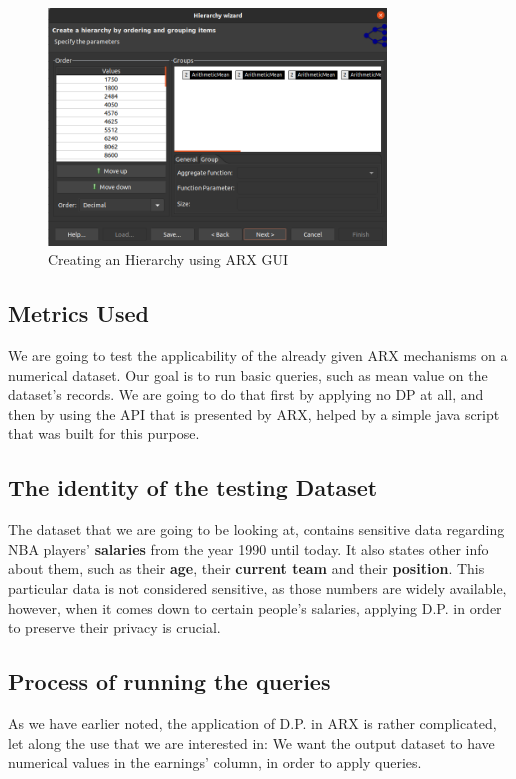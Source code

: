 \begin{figure}[!htb]\centering
    \includegraphics[width=0.8\textwidth]{images/hierarchies.png}
    \caption{Creating an Hierarchy using ARX GUI}
\end{figure}


\subsection{Metrics Used}
We are going to test the applicability of the already given ARX mechanisms on a numerical dataset. Our goal is to run basic queries, such as mean value on the dataset's records. We are going to do that first by applying no DP at all, and then by using the API that is presented by ARX, helped by a simple java script that was built for this purpose.


\subsection{The identity of the testing Dataset}
The dataset that we are going to be looking at, contains sensitive data regarding NBA players' \textbf{salaries} from the year 1990 until today. It also states other info about them, such as their \textbf{age}, their\textbf{ current team }and their \textbf{position}. This particular data is not considered sensitive, as those numbers are widely available, however, when it comes down to certain people's salaries, applying D.P. in order to preserve their privacy is crucial.

\subsection{Process of running the queries}
As we have earlier noted, the application of D.P. in ARX is rather complicated, let along the use that we are interested in: We want the output dataset to have numerical values in the earnings' column, in order to apply queries. 

